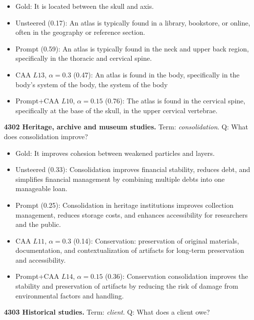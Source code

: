 \begin{itemize}\setlength{\itemsep}{0.15em}\setlength{\parsep}{0pt}\setlength{\topsep}{0.2em}
\item Gold: It is located between the skull and axis.
\item Unsteered (0.17): An atlas is typically found in a library, bookstore, or online, often in the geography or reference section.
\item Prompt (0.59): An atlas is typically found in the neck and upper back region, specifically in the thoracic and cervical spine.
\item CAA $L13$, $\alpha=0.3$ (0.47): An atlas is found in the body, specifically in the body's system of the body, the system of the body
\item Prompt+CAA $L10$, $\alpha=0.15$ (0.76): The atlas is found in the cervical spine, specifically at the base of the skull, in the upper cervical vertebrae.
\end{itemize}
\medskip\noindent\textbf{4302 Heritage, archive and museum studies.} Term: \emph{consolidation}.
Q: What does consolidation improve?
\begin{itemize}\setlength{\itemsep}{0.15em}\setlength{\parsep}{0pt}\setlength{\topsep}{0.2em}
\item Gold: It improves cohesion between weakened particles and layers.
\item Unsteered (0.33): Consolidation improves financial stability, reduces debt, and simplifies financial management by combining multiple debts into one manageable loan.
\item Prompt (0.25): Consolidation in heritage institutions improves collection management, reduces storage costs, and enhances accessibility for researchers and the public.
\item CAA $L11$, $\alpha=0.3$ (0.14): Conservation: preservation of original materials, documentation, and contextualization of artifacts for long-term preservation and accessibility.
\item Prompt+CAA $L14$, $\alpha=0.15$ (0.36): Conservation consolidation improves the stability and preservation of artifacts by reducing the risk of damage from environmental factors and handling.
\end{itemize}
\medskip\noindent\textbf{4303 Historical studies.} Term: \emph{client}.
Q: What does a client owe?
